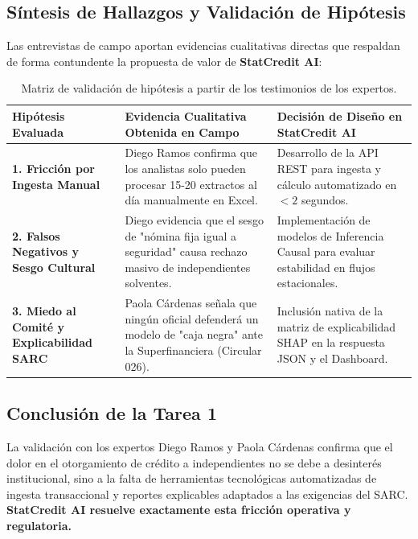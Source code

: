 \documentclass[11pt,a4paper]{article}
\begin{document}
\subsection{Síntesis de Hallazgos y Validación de Hipótesis}

Las entrevistas de campo aportan evidencias cualitativas directas que respaldan de forma contundente la propuesta de valor de \textbf{StatCredit AI}:

\begin{table}[h!]
\centering
\small
\begin{tabularx}{\textwidth}{p{3.5cm} X p{4.5cm}}
\toprule
\textbf{Hipótesis Evaluada} & \textbf{Evidencia Cualitativa Obtenida en Campo} & \textbf{Decisión de Diseño en StatCredit AI} \\
\midrule
\textbf{1. Fricción por Ingesta Manual} & Diego Ramos confirma que los analistas solo pueden procesar 15-20 extractos al día manualmente en Excel. & Desarrollo de la API REST para ingesta y cálculo automatizado en $<2$ segundos. \\
\midrule
\textbf{2. Falsos Negativos y Sesgo Cultural} & Diego evidencia que el sesgo de "nómina fija igual a seguridad" causa rechazo masivo de independientes solventes. & Implementación de modelos de Inferencia Causal para evaluar estabilidad en flujos estacionales. \\
\midrule
\textbf{3. Miedo al Comité y Explicabilidad SARC} & Paola Cárdenas señala que ningún oficial defenderá un modelo de "caja negra" ante la Superfinanciera (Circular 026). & Inclusión nativa de la matriz de explicabilidad SHAP en la respuesta JSON y el Dashboard. \\
\bottomrule
\end{tabularx}
\caption{Matriz de validación de hipótesis a partir de los testimonios de los expertos.}
\end{table}

\subsection{Conclusión de la Tarea 1}
La validación con los expertos Diego Ramos y Paola Cárdenas confirma que el dolor en el otorgamiento de crédito a independientes no se debe a desinterés institucional, sino a la falta de herramientas tecnológicas automatizadas de ingesta transaccional y reportes explicables adaptados a las exigencias del SARC. \textbf{StatCredit AI resuelve exactamente esta fricción operativa y regulatoria.}

\newpage
\end{document}
